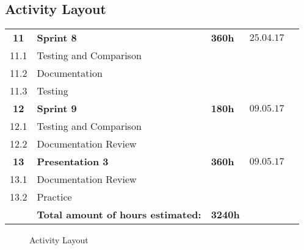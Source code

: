 \begin{center}
\section*{\textbf{Activity Layout}}
\begin{tabular}{cllll}
\rowcolor{cadetgrey}

\rowcolor{gainsboro}
\textbf{11} & \textbf{Sprint 8}     & \textbf{360h}    & $25.04.17$ \\
11.1     & Testing and Comparison &  &  \\\rowcolor{gainsboro}
11.2     & Documentation &  &  \\
11.3     & Testing & &  \\ 
\rowcolor{gainsboro}
\textbf{12} & \textbf{Sprint 9}     & \textbf{180h}     & $09.05.17$ \\
12.1     & Testing and Comparison &  &  \\\rowcolor{gainsboro}
12.2     & Documentation Review &  & \\
\textbf{13} & \textbf{Presentation 3}     & \textbf{360h}     & $09.05.17$ \\
\rowcolor{gainsboro}
13.1     & Documentation Review &  & \\
13.2     & Practice & & \\
\rowcolor{gainsboro}
         & \textbf{Total amount of hours estimated:} & \textbf{3240h} & 
\end{tabular}                                                               
\end{center}
\begin{figure}[h]
        \centering
          \centering
            \caption{Activity Layout}
            \label{list}
\end{figure}
